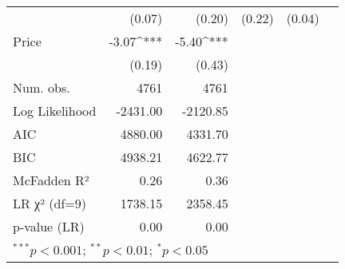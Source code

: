 \begin{table}[h]
\begin{center}
\begin{tabular}{l D{.}{.}{5.5} D{.}{.}{5.5} D{.}{.}{2.5} D{.}{.}{2.5} D{.}{.}{3.2}}
                                   & (0.07)      & (0.20)      & (0.22)      & (0.04)     &        \\
Price                              & -3.07^{***} & -5.40^{***} &             &            &        \\
                                   & (0.19)      & (0.43)      &             &            &        \\
\midrule
Num. obs.                          & 4761        & 4761        &             &            &        \\
Log Likelihood                     & -2431.00    & -2120.85    &             &            &        \\
AIC                                & 4880.00     & 4331.70     &             &            &        \\
BIC                                & 4938.21     & 4622.77     &             &            &        \\
McFadden R²                        & 0.26        & 0.36        &             &            &        \\
LR χ² (df=9)                       & 1738.15     & 2358.45     &             &            &        \\
p-value (LR)                       & 0.00        & 0.00        &             &            &        \\
\bottomrule
{}
\end{tabular}

\end{center}
\end{table}
